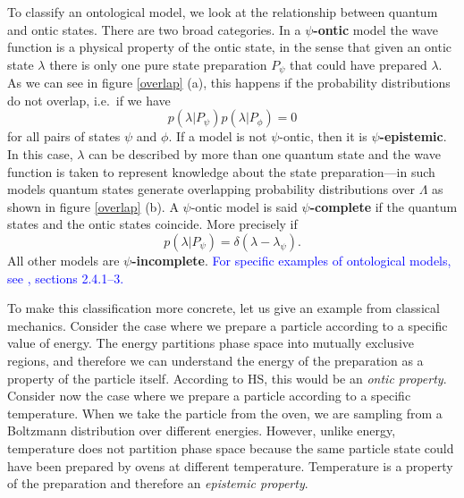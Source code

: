 \documentclass[10pt,twocolumn, nofootinbib]{revtex4-2}
\begin{document}
To classify an ontological model, we look at the relationship between quantum and ontic states. There are two broad categories. In a \textbf{$\psi$-ontic} model the wave function is a physical property of the ontic state, in the sense that given an ontic state $\lambda$ there is only one pure state preparation $P_\psi$ that could have prepared $\lambda$. As we can see in figure \ref{overlap} (a), this happens if the probability distributions do not overlap, i.e.\ if we have
\begin{equation}\label{ontic_condition}
	p(\lambda | P_{\psi})p(\lambda|P_{\phi})=0
\end{equation}
for all pairs of states $\psi$ and $\phi$. If a model is not $\psi$-ontic, then it is \textbf{$\psi$-epistemic}. In this case, $\lambda$ can be described by more than one quantum state and the wave function is taken to represent knowledge about the state preparation---in such models quantum states generate overlapping probability distributions over $\Lambda$ as shown in figure \ref{overlap} (b). A $\psi$-ontic model is said \textbf{$\psi$-complete} if the quantum states and the ontic states coincide. More precisely if 
\begin{equation}\label{complete_condition}
	p(\lambda|P_\psi)=\delta(\lambda-\lambda_{\psi}).
\end{equation}
All other models are \textbf{$\psi$-incomplete}. \textcolor{blue}{For specific examples of ontological models, see \cite{Harrigan:2010}, sections 2.4.1--3.}

To make this classification more concrete, let us give an example from classical mechanics. Consider the case where we prepare a particle according to a specific value of energy. The energy partitions phase space into mutually exclusive regions, and therefore we can understand the energy of the preparation as a property of the particle itself. According to HS, this would be an \emph{ontic property}. Consider now the case where we prepare a particle according to a specific temperature. When we take the particle from the oven, we are sampling from a Boltzmann distribution over different energies. However, unlike energy, temperature does not partition phase space because the same particle state could have been prepared by ovens at different temperature. Temperature is a property of the preparation and therefore an \emph{epistemic property}. 
\end{document}
